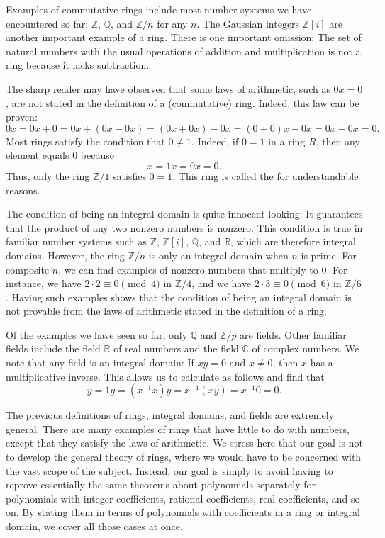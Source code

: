 Examples of commutative rings include most number systems we have encountered so far: $\mathbb{Z}$, $\mathbb{Q}$, and $\mathbb{Z}/n$ for any $n$. The Gaussian integers $\mathbb{Z}[i]$ are another important example of a ring. There is one important omission: The set of natural numbers with the usual operations of addition and multiplication is not a ring because it lacks subtraction.

The sharp reader may have observed that some laws of arithmetic, such as $0x=0$, are not stated in the definition of a (commutative) ring. Indeed, this law can be proven:
\begin{equation*}
  0x=0x+0=0x+(0x-0x)=(0x+0x)-0x=(0+0)x-0x=0x-0x=0.
\end{equation*}
Most rings satisfy the condition that $0\neq 1$. Indeed, if $0=1$ in a ring $R$, then any element equals $0$ because
\begin{equation*}
  x=1x=0x=0.
\end{equation*}
Thus, only the ring $\mathbb{Z}/1$ satisfies $0=1$. This ring is called the  for understandable reasons.

The condition of being an integral domain is quite innocent-looking: It guarantees that the product of any two nonzero numbers is nonzero. This condition is true in familiar number systems such as $\mathbb{Z}$, $\mathbb{Z}[i]$, $\mathbb{Q}$, and $\mathbb{R}$, which are therefore integral domains. However, the ring $\mathbb{Z}/n$ is only an integral domain when $n$ is prime. For composite $n$, we can find examples of nonzero numbers that multiply to $0$. For instance, we have $2\cdot 2\equiv 0\pmod{4}$ in $\mathbb{Z}/4$, and we have $2\cdot 3\equiv 0\pmod{6}$ in $\mathbb{Z}/6$. Having such examples shows that the condition of being an integral domain is not provable from the laws of arithmetic stated in the definition of a ring.

Of the examples we have seen so far, only $\mathbb{Q}$ and $\mathbb{Z}/p$ are fields. Other familiar fields include the field $\mathbb{R}$ of real numbers and the field $\mathbb{C}$ of complex numbers. We note that any field is an integral domain: If $xy=0$ and $x\neq 0$, then $x$ has a multiplicative inverse. This allows us to calculate as follows and find that
\begin{equation*}
  y=1y=(x^{-1}x)y=x^{-1}(xy)=x^{-1}0=0.
\end{equation*}

The previous definitions of rings, integral domains, and fields are extremely general. There are many examples of rings that have little to do with numbers, except that they satisfy the laws of arithmetic. We stress here that our goal is not to develop the general theory of rings, where we would have to be concerned with the vast scope of the subject. Instead, our goal is simply to avoid having to reprove essentially the same theorems about polynomials separately for polynomials with integer coefficients, rational coefficients, real coefficients, and so on. By stating them in terms of polynomials with coefficients in a ring or integral domain, we cover all those cases at once.

